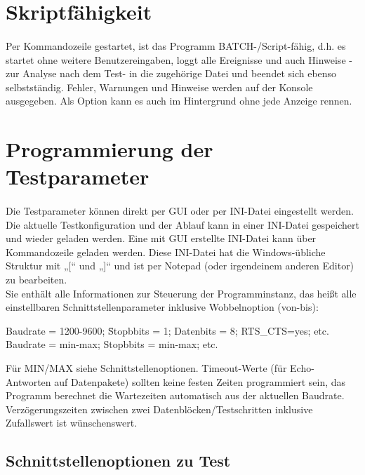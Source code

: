 \section{Skriptfähigkeit}
\paragraph{}
Per Kommandozeile gestartet, ist das Programm BATCH-/Script-fähig, d.h. es startet ohne weitere Benutzereingaben, loggt alle Ereignisse und auch Hinweise -zur Analyse nach dem Test- in die zugehörige Datei und beendet sich ebenso selbstständig. Fehler, Warnungen und Hinweise werden auf der Konsole ausgegeben. Als Option kann es auch im Hintergrund ohne jede Anzeige rennen.


\section{Programmierung der Testparameter}
\paragraph{}
Die Testparameter können direkt per GUI oder per INI-Datei eingestellt werden. Die aktuelle Testkonfiguration und der Ablauf kann in einer INI-Datei gespeichert und wieder geladen werden. Eine mit GUI erstellte INI-Datei kann über Kommandozeile geladen werden. Diese INI-Datei hat die Windows-übliche Struktur mit „[“ und „]“ und ist per Notepad (oder irgendeinem anderen Editor) zu bearbeiten.
\\
Sie enthält alle Informationen zur Steuerung der Programminstanz, das heißt alle einstellbaren Schnittstellenparameter inklusive Wobbelnoption (von-bis):
\begin{tabbing}
\hspace*{10mm}Baudrate = 1200-9600; \=Stopbbits = 1; Datenbits = 8; RTS\_CTS=yes; etc.
\\
\hspace*{10mm}Baudrate = min-max; \>Stopbbits = min-max; etc.
\end{tabbing}

Für MIN/MAX siehe Schnittstellenoptionen. Timeout-Werte (für Echo-Antworten auf Datenpakete) sollten keine festen Zeiten programmiert sein, das Programm  berechnet die Wartezeiten automatisch aus der aktuellen Baudrate. Verzögerungszeiten zwischen zwei Datenblöcken/Testschritten inklusive Zufallswert ist wünschenswert.


\subsection{Schnittstellenoptionen zu Test}
